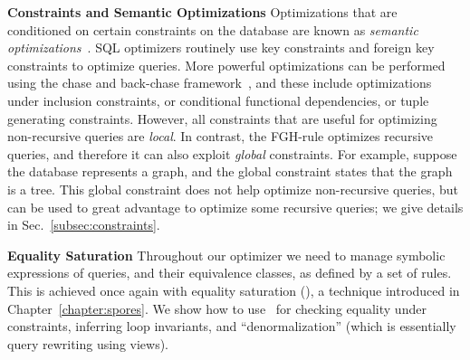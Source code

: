 {\bf Constraints and Semantic Optimizations} Optimizations that are
conditioned on certain constraints on the database are known as {\em
semantic optimizations}~\cite{DBLP:journals/debu/RamakrishnanS94}.
SQL optimizers routinely use key constraints and foreign key
constraints to optimize queries.  More powerful optimizations can
be performed using the chase and back-chase
framework~\cite{DBLP:conf/vldb/DeutschPT99,DBLP:conf/sigmod/PopaDST00},
and these include optimizations under inclusion constraints, or
conditional functional dependencies, or tuple generating constraints.
However, all constraints that are useful for optimizing non-recursive
queries are {\em local}.  In contrast, the FGH-rule optimizes
recursive queries, and therefore it can also exploit {\em global}
constraints.  For example, suppose the database represents a graph,
and the global constraint states that the graph is a tree.  This
global constraint does not help optimize non-recursive queries, but
can be used to great advantage to optimize some recursive queries; we
give details in Sec.~\ref{subsec:constraints}.

{\bf Equality Saturation} Throughout our optimizer we need to
manage symbolic expressions of queries, and their equivalence classes,
as defined by a set of rules.  
This is achieved once again with equality saturation (\eqsat), 
 a technique introduced in Chapter~\ref{chapter:spores}.
We show how to use
\eqsat\ for checking equality under constraints, inferring loop
invariants, and ``denormalization'' (which is essentially query
rewriting using views).







